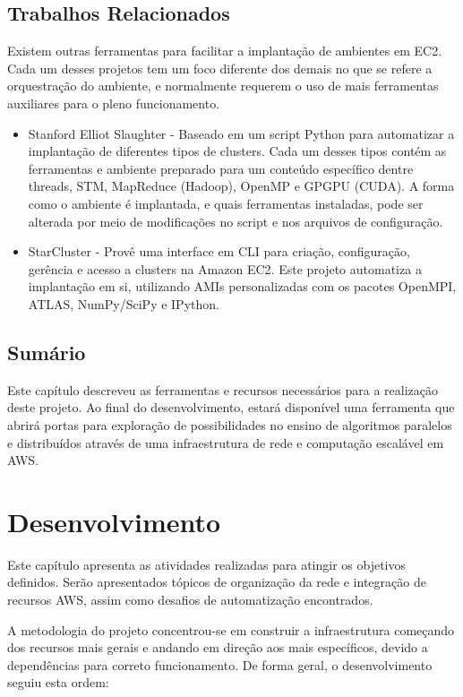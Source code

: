 \documentclass[tg]{mdtufsm}
\begin{document}
\section{Trabalhos Relacionados}

Existem outras ferramentas para facilitar a implantação de ambientes em EC2. Cada um desses projetos tem um foco diferente dos demais no que se refere a orquestração do ambiente, e normalmente requerem o uso de mais ferramentas auxiliares para o pleno funcionamento.

\begin{itemize}
	\item Stanford Elliot Slaughter - Baseado em um script Python para automatizar a implantação de diferentes tipos de clusters. Cada um desses tipos contém as ferramentas e ambiente preparado para um conteúdo específico dentre threads, STM, MapReduce (Hadoop), OpenMP e GPGPU (CUDA). A forma como o ambiente é implantada, e quais ferramentas instaladas, pode ser alterada por meio de modificações no script e nos arquivos de configuração.
	
	\item StarCluster \cite{starcluster} - Provê uma interface em CLI para criação, configuração, gerência e acesso a clusters na Amazon EC2. Este projeto automatiza a implantação em si, utilizando AMIs personalizadas com os pacotes OpenMPI, ATLAS, NumPy/SciPy e IPython.
\end{itemize}

\section{Sumário}

Este capítulo descreveu as ferramentas e recursos necessários para a realização deste projeto. Ao final do desenvolvimento, estará disponível uma ferramenta que abrirá portas para exploração de possibilidades no ensino de algoritmos paralelos e distribuídos através de uma infraestrutura de rede e computação escalável em AWS.

\chapter{Desenvolvimento}

Este capítulo apresenta as atividades realizadas para atingir os objetivos definidos. Serão apresentados tópicos de organização da rede e integração de recursos AWS, assim como desafios de automatização encontrados.

A metodologia do projeto concentrou-se em construir a infraestrutura começando dos recursos mais gerais e andando em direção aos mais específicos, devido a dependências para correto funcionamento. De forma geral, o desenvolvimento seguiu esta ordem:
\end{document}
